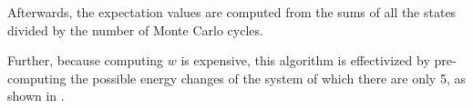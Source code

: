 \documentclass[10pt,showpacs,preprintnumbers,amsmath,amssymb,nofootinbib,aps,prl,twocolumn,groupedaddress,superscriptaddress,showkeys]{revtex4-1}
\begin{document}
    Afterwards, the expectation values are computed from the sums of all the states divided by the number of Monte Carlo cycles.

    Further, because computing $w$ is expensive, this algorithm is effectivized by pre-computing the possible energy changes of the system of which there are only 5, as shown in \textcite{statmek_lecnotes}.


  \begin{figure}[h!p]
    \centering
    \\
\end{figure}
\end{document}

